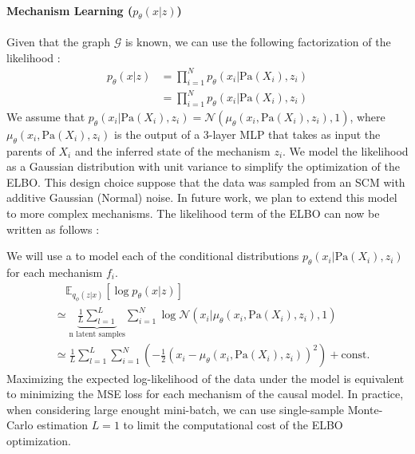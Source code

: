 \documentclass{article}
\begin{document}
\paragraph{Mechanism Learning ($p_\theta(x | z)$)}

Given that the graph $\mathcal{G}$ is known, we can use the following
factorization of the likelihood :
\begin{align*}
    p_\theta(x | z) & = \prod_{i = 1}^N p_\theta(x_i | \text{Pa}(X_i), z_i) \\
                    & = \prod_{i = 1}^N p_\theta(x_i | \text{Pa}(X_i), z_i)
\end{align*}
We assume that $p_\theta(x_i | \text{Pa}(X_i), z_i) = \mathcal{N}(\mu_\theta(x_i, \text{Pa}(X_i), z_i), 1)$, where $\mu_\theta(x_i, \text{Pa}(X_i), z_i)$ is the output of a 3-layer MLP that takes as input the parents of $X_i$ and the inferred state of the mechanism $z_i$. We model the likelihood as a Gaussian distribution with unit variance to simplify the optimization of the ELBO. This design choice suppose that the data was sampled from an SCM with additive Gaussian (Normal) noise. In future work, we plan to extend this model to more complex mechanisms.
The likelihood term of the ELBO can now be written as follows :

We will use a to model each of the conditional distributions $p_\theta(x_i |
    \text{Pa}(X_i), z_i)$ for each mechanism $f_i$.
\begin{align*}
     & \quad \mathbb{E}_{q_\phi(z | x)} \left[ \log p_\theta(x | z) \right]                                                                                     \\ &\simeq \underbrace{\frac{1}{L} \sum_{l = 1}^L }_{\text{n latent samples}} \sum_{i = 1}^N \log \mathcal{N}(x_i | \mu_\theta(x_i, \text{Pa}(X_i), z_i), 1)\\
     & \simeq \frac{1}{L} \sum_{l = 1}^L \sum_{i = 1}^N \left( -\frac{1}{2} \left( x_i - \mu_\theta(x_i, \text{Pa}(X_i), z_i) \right)^2 \right) + \text{const.}
\end{align*}
Maximizing the expected log-likelihood of the data under the model is equivalent to minimizing the MSE loss for each mechanism of the causal model. In practice, when considering large enought mini-batch, we can use single-sample Monte-Carlo estimation $L=1$ to limit the computational cost of the ELBO optimization.
\end{document}
